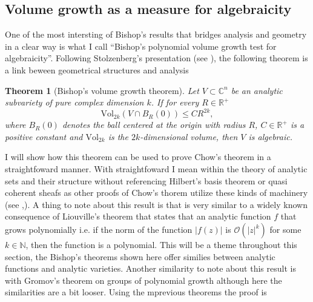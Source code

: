 \documentclass[12pt,twoside,a4paper]{report}
\newtheorem{theorem}{Theorem}[section]
\newcommand{\nat}{\ensuremath{ \mathbb N }}
\newcommand{\re}{\ensuremath{\mathbb R }}
\newcommand{\con}{\ensuremath{\mathbb{C}^n}}
\newcommand{\osheaf}{\ensuremath{\mathcal O }}
\begin{document}
  \subsection{Volume growth as a measure for algebraicity}

  \noindent One of the most intersting of Bishop's results that bridges analysis and geometry in a clear way is what I call ``Bishop's polynomial volume growth test for algebraicity''. Following Stolzenberg's presentation (see \cite{Stolzenberg}), the following theorem is a link beween geometrical structures and analysis
  \begin{theorem}[Bishop's volume growth theorem]\label{Bishop1}
          Let $V\subset\con$ be an analytic subvariety of pure complex dimension $k$. If for every $R\in\re^+$
          \[
            \textrm{Vol}_{2k}(V\cap B_R(0))\leq CR^{2k},
          \]
          where $B_R(0)$ denotes the ball centered at the origin with radius $R$, $C\in\re^{+}$ is a positive constant
          and $\textrm{Vol}_{2k}$ is the $2k$-dimensional volume, then $V$ is algebraic.
  \end{theorem}

  I will show how this theorem can be used to prove Chow's theorem in a straightfoward manner. With straightfoward I mean within the theory of analytic sets and their structure without referencing Hilbert's basis theorem or quasi coherent sheafs as other proofs of Chow's thorem utilize these kinds of machinery (see \cite{GAGA},\cite{chow-proofs}). A thing to note about this result is that is very similar to a widely known consequence of Liouville's theorem that states that an analytic function $f$ that grows polynomially i.e. if the norm of the function $|f(z)|$ is $\osheaf(|z|^{k})$ for some $k\in\nat$, then the function is a polynomial. This will be a theme throughout this section, the Bishop's theorems shown here offer similies between analytic functions and analytic varieties. Another similarity to note about this result is with Gromov's theorem on groups of polynomial growth although here the similarities are a bit looser. Using the mprevious theorems the proof is
\end{document}
